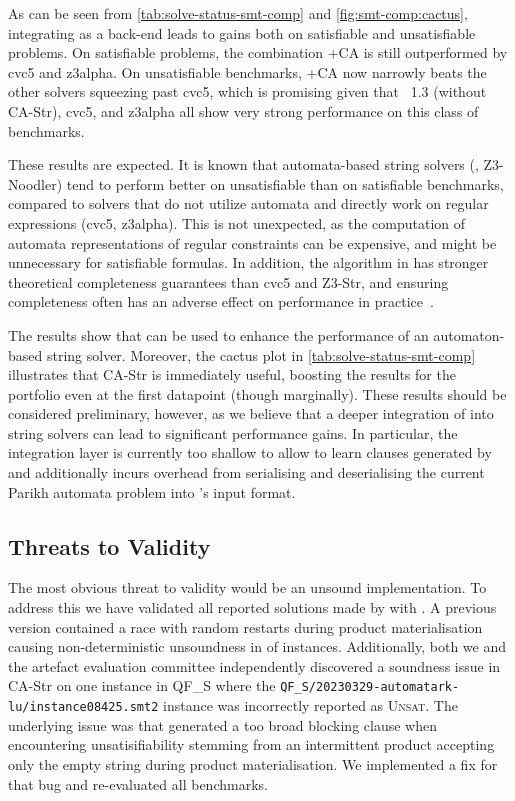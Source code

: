 As can be seen from \cref{tab:solve-status-smt-comp} and \cref{fig:smt-comp:cactus},
integrating \Catra{} as a back-end
leads to gains both on satisfiable and unsatisfiable problems. On
satisfiable problems, the combination \Ostrich+CA is still
outperformed by cvc5 and z3alpha. On unsatisfiable benchmarks,
\Ostrich+CA now narrowly beats the other solvers squeezing past cvc5,
which is promising given that \Ostrich{}~1.3 (without CA-Str), cvc5, and z3alpha all show very strong
performance on this class of benchmarks.

These results are expected. It is known that automata-based string solvers (\Ostrich{}, Z3-Noodler) 
tend to perform better on unsatisfiable than on satisfiable benchmarks, compared to solvers
that do not utilize automata and directly work on regular expressions (cvc5, z3alpha).
This is not unexpected, as the computation of automata representations of regular 
constraints can be expensive, and might be unnecessary for satisfiable formulas.
In addition, the algorithm in \Ostrich{} has stronger theoretical completeness
guarantees than cvc5 and Z3-Str, and ensuring completeness often has an adverse
effect on performance in practice~\cite{ostrich,Z3-str,cvc5}.

The results show that \Calculus{} can be used to enhance the performance of an
automaton-based string solver. Moreover, the cactus plot in \cref{tab:solve-status-smt-comp} 
illustrates that
CA-Str is immediately useful, boosting the results for the \Ostrich{} portfolio
even at the first datapoint (though marginally). These results should be considered preliminary,
however, as we believe that a deeper integration of \Catra{} into string solvers
can lead to significant performance gains. In particular, the integration layer 
is currently too shallow to allow \Ostrich{} to learn clauses generated by \Catra{}
and additionally incurs overhead from serialising and deserialising the current Parikh
automata problem into \Catra{}'s input format.

\subsection{Threats to Validity}

The most obvious threat to validity would be an unsound implementation. To
address this we have validated all reported solutions made by \Calculus{} with
\Nuxmv{}. A previous version contained a race with random restarts during
product materialisation causing non-deterministic unsoundness in 
of instances. Additionally, both we and the artefact evaluation committee independently
discovered a soundness issue in CA-Str on one instance in QF\_S where the 
\texttt{QF\_S\slash{}20230329-automatark-lu\slash{}instance08425.smt2} instance was
incorrectly reported as \textsc{Unsat}. The underlying issue was that \Catra{} generated
a too broad blocking clause when encountering unsatisifiability stemming from 
an intermittent product accepting only the empty string during product materialisation. 
We implemented a fix for that bug and re-evaluated all benchmarks.

